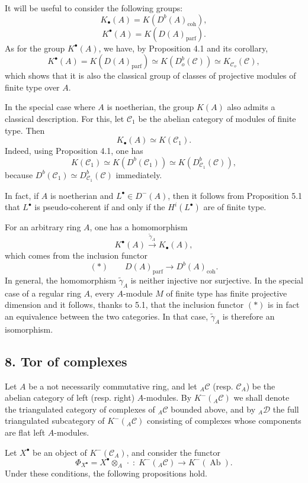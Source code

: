 \documentclass[11pt]{article}
\providecommand{\parf}{\mathrm{parf}}
\providecommand{\coh}{\mathrm{coh}}
\providecommand{\cC}{\mathcal C}
\providecommand{\Ab}{\operatorname{Ab}}
\providecommand{\cC}{\mathcal C}
\providecommand{\cD}{\mathcal D}
\providecommand{\Ab}{\operatorname{Ab}}
\providecommand{\parf}{\mathrm{parf}}
\providecommand{\coh}{\mathrm{coh}}
\begin{document}
It will be useful to consider the following groups:
\[
K_\bullet(A)=K(D^b(A)_{\coh}),
\]
\[
K^\bullet(A)=K(D(A)_{\parf}).
\]
As for the group $K^\bullet(A)$, we have, by Proposition 4.1 and its corollary,
\[
K^\bullet(A)=K(D(A)_{\parf})\simeq K(D_o^b(\cC))\simeq K_{\cC_o}(\cC),
\]
which shows that it is also the classical group of classes of projective modules of finite type over $A$.

In the special case where $A$ is noetherian, the group $K(A)$ also admits a classical description. For this, let $\cC_1$ be the abelian category of modules of finite type. Then
\[
K_\bullet(A)\simeq K(\cC_1).
\]
Indeed, using Proposition 4.1, one has
\[
K(\cC_1)\simeq K(D^b(\cC_1))\simeq K(D^b_{\cC_1}(\cC)),
\]
because $D^b(\cC_1)\simeq D^b_{\cC_1}(\cC)$ immediately.

In fact, if $A$ is noetherian and $L^\bullet\in D^-(A)$, then it follows from Proposition 5.1 that $L^\bullet$ is pseudo-coherent if and only if the $H^i(L^\bullet)$ are of finite type.

For an arbitrary ring $A$, one has a homomorphism
\[
K^\bullet(A)\xrightarrow{\widetilde\gamma_A}K_\bullet(A),
\]
which comes from the inclusion functor
\[
(*)\qquad D(A)_{\parf}\longrightarrow D^b(A)_{\coh}.
\]
In general, the homomorphism $\widetilde\gamma_A$ is neither injective nor surjective. In the special case of a regular ring $A$, every $A$-module $M$ of finite type has finite projective dimension and it follows, thanks to 5.1, that the inclusion functor $(*)$ is in fact an equivalence between the two categories. In that case, $\widetilde\gamma_A$ is therefore an isomorphism.

\subsection*{8. Tor of complexes}

Let $A$ be a not necessarily commutative ring, and let ${}_A\cC$ (resp. $\cC_A$) be the abelian category of left (resp. right) $A$-modules. By $K^-({}_A\cC)$ we shall denote the triangulated category of complexes of ${}_A\cC$ bounded above, and by ${}_A\cD$ the full triangulated subcategory of $K^-({}_A\cC)$ consisting of complexes whose components are flat left $A$-modules.

Let $X^\bullet$ be an object of $K^-(\cC_A)$, and consider the functor
\[
\Phi_{X^\bullet}=X^\bullet\otimes_A\,\cdot\;:\;K^-({}_A\cC)\longrightarrow K^-(\Ab).
\]
Under these conditions, the following propositions hold.
\end{document}
